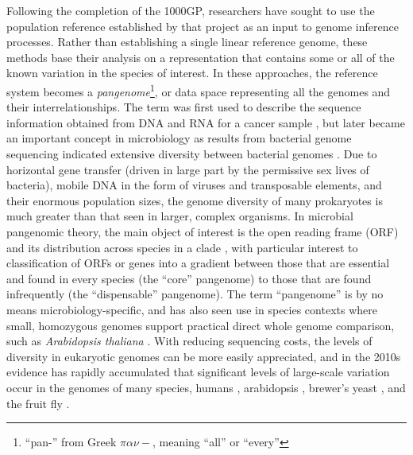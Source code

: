\documentclass[a4paper,12pt,numbered,oneside]{Classes/PhDThesisPSnPDF}
\begin{document}
Following the completion of the 1000GP, researchers have sought to use the population reference established by that project as an input to genome inference processes.
Rather than establishing a single linear reference genome, these methods base their analysis on a representation that contains some or all of the known variation in the species of interest.
In these approaches, the reference system becomes a \emph{pangenome}\footnote{``pan-'' from Greek $\pi\alpha\nu-$, meaning ``all'' or ``every''}, or data space representing all the genomes and their interrelationships.
The term was first used to describe the sequence information obtained from DNA and RNA for a cancer sample \cite{sigaux2000cancer}, but later became an important concept in microbiology as results from bacterial genome sequencing indicated extensive diversity between bacterial genomes \cite{tettelin2005genome,medini2005microbial}.
Due to horizontal gene transfer (driven in large part by the permissive sex lives of bacteria), mobile DNA in the form of viruses and transposable elements, and their enormous population sizes, the genome diversity of many prokaryotes is much greater than that seen in larger, complex organisms.
In microbial pangenomic theory, the main object of interest is the open reading frame (ORF) and its distribution across species in a clade \cite{vernikos2015ten}, with particular interest to classification of ORFs or genes into a gradient between those that are essential and found in every species (the ``core'' pangenome) to those that are found infrequently (the ``dispensable'' pangenome).
The term ``pangenome'' is by no means microbiology-specific, and has also seen use in species contexts where small, homozygous genomes support practical direct whole genome comparison, such as \emph{Arabidopsis thaliana} \cite{cao2011whole}.
With reducing sequencing costs, the levels of diversity in eukaryotic genomes can be more easily appreciated, and in the 2010s evidence has rapidly accumulated that significant levels of large-scale variation occur in the genomes of many species, humans \cite{li2010building,sudmant2010,sudmant2015integrated,chaisson2018multi}, arabidopsis \cite{alonso2016arabidopsis}, brewer's yeast \cite{yue2017contrasting}, and the fruit fly \cite{chakraborty2018hidden}.
\end{document}

